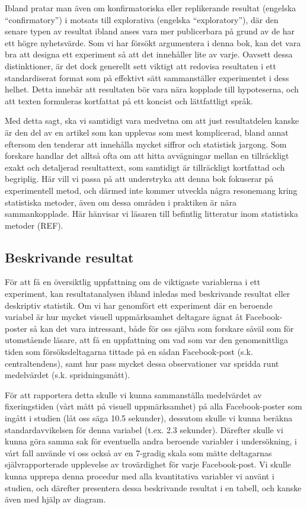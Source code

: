 \documentclass[
]{book}
\begin{document}
Ibland pratar man även om konfirmatoriska eller replikerande resultat (engelska ``confirmatory'') i motsats till explorativa (engelska ``exploratory''), där den senare typen av resultat ibland anses vara mer publicerbara på grund av de har ett högre nyhetsvärde. Som vi har försökt argumentera i denna bok, kan det vara bra att designa ett experiment så att det innehåller lite av varje. Oavsett dessa distinktioner, är det dock generellt sett viktigt att redovisa resultaten i ett standardiserat format som på effektivt sätt sammanställer experimentet i dess helhet. Detta innebär att resultaten bör vara nära kopplade till hypoteserna, och att texten formuleras kortfattat på ett koncist och lättfattligt språk.

Med detta sagt, ska vi samtidigt vara medvetna om att just resultatdelen kanske är den del av en artikel som kan upplevas som mest komplicerad, bland annat eftersom den tenderar att innehålla mycket siffror och statistisk jargong. Som forskare handlar det alltså ofta om att hitta avvägningar mellan en tillräckligt exakt och detaljerad resultattext, som samtidigt är tillräckligt kortfattad och begriplig. Här vill vi passa på att understryka att denna bok fokuserar på experimentell metod, och därmed inte kommer utveckla några resonemang kring statistiska metoder, även om dessa områden i praktiken är nära sammankopplade. Här hänvisar vi läsaren till befintlig litteratur inom statistiska metoder (REF).

\hypertarget{sub08.1.1}{%
\subsection{Beskrivande resultat}\label{sub08.1.1}}

För att få en översiktlig uppfattning om de viktigaste variablerna i ett experiment, kan resultatanalysen ibland inledas med beskrivande resultat eller deskriptiv statistik. Om vi har genomfört ett experiment där en beroende variabel är hur mycket visuell uppmärksamhet deltagare ägnat åt Facebook-poster så kan det vara intressant, både för oss själva som forskare såväl som för utomstående läsare, att få en uppfattning om vad som var den genomsnittliga tiden som försöksdeltagarna tittade på en sådan Facebook-post (s.k. centraltendens), samt hur pass mycket dessa observationer var spridda runt medelvärdet (s.k. spridningsmått).

För att rapportera detta skulle vi kunna sammanställa medelvärdet av fixeringstiden (vårt mått på visuell uppmärksamhet) på alla Facebook-poster som ingått i studien (låt oss säga 10.5 sekunder), dessutom skulle vi kunna beräkna standardavvikelsen för denna variabel (t.ex. 2.3 sekunder). Därefter skulle vi kunna göra samma sak för eventuella andra beroende variabler i undersökning, i vårt fall använde vi oss också av en 7-gradig skala som mätte deltagarnas självrapporterade upplevelse av trovärdighet för varje Facebook-post. Vi skulle kunna upprepa denna procedur med alla kvantitativa variabler vi använt i studien, och därefter presentera dessa beskrivande resultat i en tabell, och kanske även med hjälp av diagram.
\end{document}
